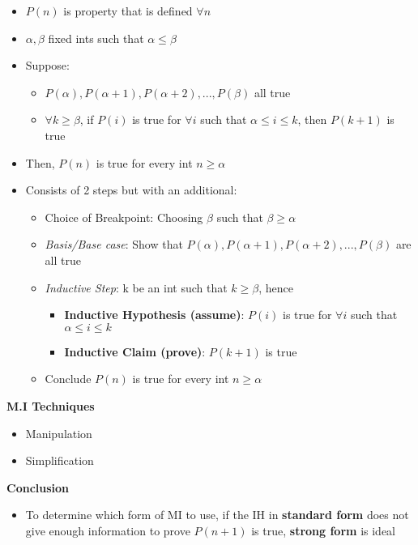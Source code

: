 \documentclass[10pt, 
a4paper, 
oneside, 
headinclude, footinclude, 
BCOR5mm]
{scrartcl}
\begin{document}
\begin{itemize}
    \item $P(n)$ is property that is defined $\forall n$
    \item $\alpha, \beta$ fixed ints such that $\alpha \leq \beta$
    \item Suppose:
    \begin{itemize}
        \item $P(\alpha), P(\alpha + 1), P(\alpha + 2),..., P(\beta)$ all true
        \item $\forall k \geq \beta$, if $P(i)$ is true for $\forall i$ such that $\alpha \leq i \leq k$, then $P(k + 1)$ is true
    \end{itemize}
    \item Then, $P(n)$ is true for every int $n \geq \alpha$
    \item Consists of 2 steps but with an additional:
    \begin{itemize}
        \item Choice of Breakpoint: Choosing $\beta$ such that $\beta \geq \alpha$
        \item \textit{Basis/Base case}: Show that $P(\alpha), P(\alpha + 1), P(\alpha + 2),..., P(\beta)$ are all true
        \item \textit{Inductive Step}: k be an int such that $k \geq \beta$, hence
        \begin{itemize}
            \item \textbf{Inductive Hypothesis (assume)}: $P(i)$ is true for $\forall i$ such that $\alpha \leq i \leq k$
            \item \textbf{Inductive Claim (prove)}: $P(k + 1)$ is true
        \end{itemize}
        \item Conclude $P(n)$ is true for every int $n \geq \alpha$
    \end{itemize} 
\end{itemize}
\textbf{M.I Techniques}
\begin{itemize}
    \item Manipulation
    \item Simplification
\end{itemize}
\textbf{Conclusion}
\begin{itemize}
    \item To determine which form of MI to use, if the IH in \textbf{standard form} does not give enough information to prove $P(n + 1)$ is true, \textbf{strong form} is ideal
\end{itemize}
\end{document}
